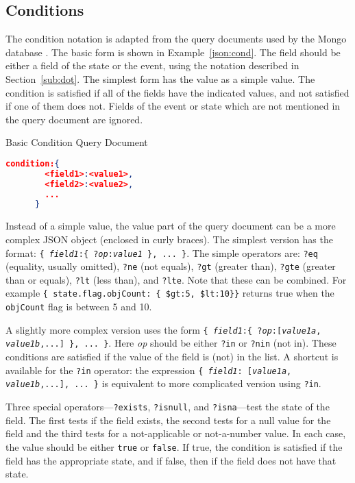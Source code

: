 \documentclass{article}
\begin{document}
  \subsection{Conditions}
  \label{sub:cond}

  The condition notation is adapted from the query documents used by
  the Mongo database \cite{mongo}.  The basic form is shown in
  Example~\ref{json:cond}.  The field should be
  either a field of the state or the event, using the notation
  described in Section~\ref{sub:dot}.  The simplest form has the value
  as a simple value.  The condition is satisfied if all of the fields
  have the indicated values, and not satisfied if one of them does
  not.  Fields of the event or state which are not mentioned in the
  query document are ignored.

  \begin{algorithm}
    \caption{Basic Condition Query Document}
    \label{json:cond}
    \begin{lstlisting}[language=json]
      condition:{
        <field1>:<value1>,
        <field2>:<value2>,
        ...
      }
    \end{lstlisting}
  \end{algorithm}

  Instead of a simple value, the value part of the query document can
  be a more complex JSON object (enclosed in curly braces).  The
  simplest version has the format:  \texttt{\{ \textit{field1}:\{
    ?\textit{op}:\textit{value1} \}, ... \}}.  The simple operators
  are: \texttt{?eq} (equality, usually omitted), \texttt{?ne} (not
  equals), \texttt{?gt} (greater than), \texttt{?gte} (greater than
  or equals), \texttt{?lt} (less than), and \texttt{?lte}.  Note
  that these can be combined.  For example
  \verb|{ state.flag.objCount: { $gt:5, $lt:10}}| returns true when
  the \texttt{objCount} flag is between 5 and 10.

  A slightly more complex version uses the form \texttt{\{ \textit{field1}:\{
    ?\textit{op}:[\textit{value1a}, \textit{value1b},...] \},
    ... \}}.  Here \textit{op} should be either \texttt{?in} or
  \texttt{?nin} (not in).  These conditions are satisfied if the
  value of the field is (not) in the list.  A shortcut is available
  for the \texttt{?in} operator:  the expression \texttt{\{
    \textit{field1}: [\textit{value1a}, \textit{value1b},...], ... \}}
  is equivalent to more complicated version using \texttt{?in}.

  Three special operators---\texttt{?exists}, \texttt{?isnull}, and
  \texttt{?isna}---test the state of the field.  The first tests if
  the field exists, the second tests for a null value for the field
  and the third tests for a not-applicable or not-a-number value.  In
  each case, the value should be either \texttt{true} or
  \texttt{false}.  If true, the condition is satisfied if the field
  has the appropriate state, and if false, then if the field does not
  have that state.
\end{document}
